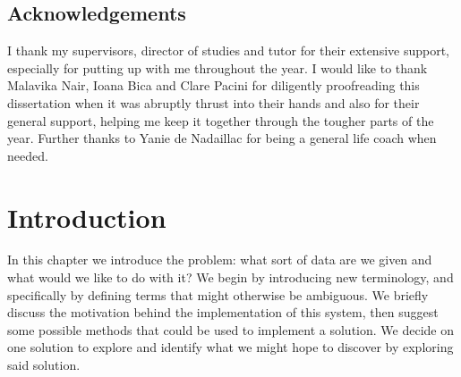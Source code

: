 \documentclass[12pt,twoside,notitlepage]{report}
\begin{document}

\listoffigures

\listoftables

\lstlistoflistings











\clearpage
\section*{Acknowledgements}

I thank my supervisors, director of studies and tutor for their extensive support, especially for putting up with me 
throughout the year. I would like to thank Malavika Nair, Ioana Bica and Clare Pacini for diligently proofreading 
this dissertation when it was abruptly thrust into their hands and also for their general support, helping me keep it together 
through the tougher parts of the year. Further thanks to Yanie de Nadaillac for being a general life coach when needed.











\cleardoublepage        %

\setcounter{page}{1}
\pagestyle{headings}
















\cleardoublepage
\chapter{Introduction}
    In this chapter we introduce the problem: what sort of data are we given and what would we like to do with it? We 
    begin by introducing new terminology, and specifically by defining terms that might otherwise be ambiguous. We briefly 
    discuss the motivation behind the implementation of this system, then suggest some possible methods that 
    could be used to implement a solution. We decide on one solution to explore and identify what we might hope to discover 
    by exploring said solution.
\end{document}
